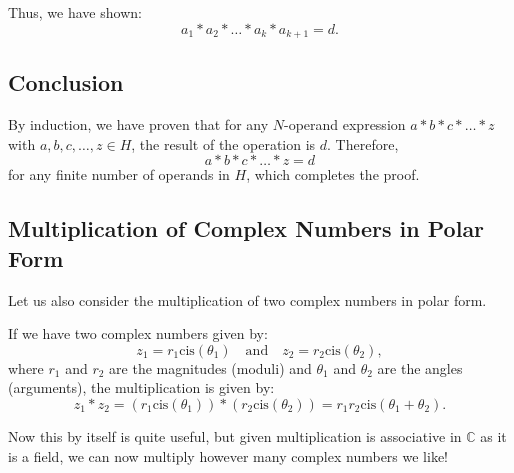 \documentclass{article}
\begin{document}
Thus, we have shown:
\[
a_1 * a_2 * \dots * a_k * a_{k+1} = d.
\]

\subsection{Conclusion}
By induction, we have proven that for any \( N \)-operand expression \( a * b * c * \dots * z \) with \( a, b, c, \dots, z \in H \), the result of the operation is \( d \). Therefore,
\[
a * b * c * \dots * z = d
\]
for any finite number of operands in \( H \), which completes the proof.

\subsection{Multiplication of Complex Numbers in Polar Form}
Let us also consider the multiplication of two complex numbers in polar form. 

If we have two complex numbers given by:
\[
z_1 = r_1 \text{cis}(\theta_1) \quad \text{and} \quad z_2 = r_2 \text{cis}(\theta_2),
\]
where \( r_1 \) and \( r_2 \) are the magnitudes (moduli) and \( \theta_1 \) and \( \theta_2 \) are the angles (arguments), the multiplication is given by:
\[
z_1 * z_2 = (r_1 \text{cis}(\theta_1)) * (r_2 \text{cis}(\theta_2)) = r_1 r_2 \text{cis}(\theta_1 + \theta_2).
\]

Now this by itself is quite useful, but given multiplication is associative in $\mathbb{C}$ as it is a field, we can now multiply however many complex numbers we like!
\end{document}
